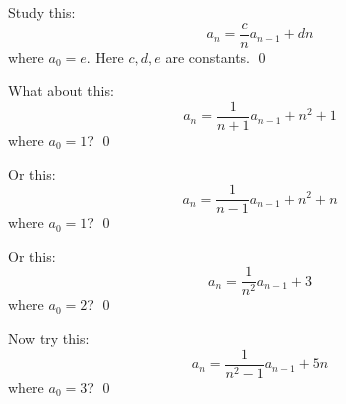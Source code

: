 \begin{comment}
Can we find the closed form using an ad-hoc method?
\begin{align*}
a_n
&= \frac{1}{n} a_{n-1} + n \\
&= \frac{1}{n} \left( \frac{1}{n-1} a_{n-2} + n - 1 \right) + n \\
&= \frac{1}{n(n-1)} a_{n-2} + \frac{n - 1}{n} + n \\
&= \frac{1}{n(n-1)}
   \left(
     \frac{1}{n-2} a_{n-3} + n - 2
   \right)
   + \frac{n - 1}{n} + n \\
&= \frac{1}{n(n-1)(n-2)} a_{n-3}
   + \frac{n - 2}{n(n-1)} 
   + \frac{n - 1}{n} + n \\
&= \frac{1}{n(n-1)(n-2)}
   \left(
     \frac{1}{n-3} a_{n-4} + n - 3 
   \right)
   + \frac{n - 2}{n(n-1)} 
   + \frac{n - 1}{n} + n \\
&= \frac{1}{n(n-1)(n-2)(n-3)} a_{n-4}
   + \frac{n - 3}{n(n-1)(n-2)} 
   + \frac{n - 2}{n(n-1)} 
   + \frac{n - 1}{n} + n \\
&= \ldots \\
&= \frac{1}{n(n-1)(n-2)(n-3)\cdots(1)} a_{0}
\\
   &\hspace{1cm} + \frac{n - 3}{n(n-1)(n-2)} 
   + \frac{n - 2}{n(n-1)} 
   + \frac{n - 1}{n} + n \\
\end{align*}
\end{comment}


\newpage
\begin{ex}
  Study this:
  \[
  a_n = \frac{c}{n} a_{n - 1} + dn
  \]
  where $a_0 = e$.
  Here $c,d,e$ are constants.
  \qed
\end{ex}

\newpage
\begin{ex}
  What about this:
  \[
  a_n = \frac{1}{n + 1} a_{n - 1} + n^2 + 1
  \]
  where $a_0 = 1$?
  \qed
\end{ex}



\newpage
\begin{ex}
  Or this:
  \[
  a_n = \frac{1}{n - 1} a_{n - 1} + n^2 + n
  \]
  where $a_0 = 1$?
  \qed
\end{ex}

\newpage
\begin{ex}
  Or this:
  \[
  a_n = \frac{1}{n^2} a_{n - 1} + 3
  \]
  where $a_0 = 2$?
  \qed
\end{ex}



\newpage
\begin{ex}
  Now try this:
  \[
  a_n = \frac{1}{n^2 - 1} a_{n - 1} + 5n
  \]
  where $a_0 = 3$?
  \qed
\end{ex}

